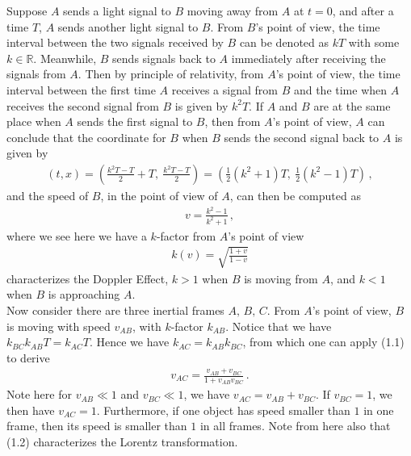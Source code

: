 \documentclass[11pt, onesided]{book}
\theoremstyle{break}
\theoremstyle{break}
\newcommand{\R}{\mathbb{R}}
\begin{document}
Suppose $A$ sends a light signal to $B$ moving away from $A$ at $t=0$, and after a time $T$, $A$ sends another light signal to $B$. From $B$'s point of view, the time interval between the two signals received by $B$ can be denoted as $kT$ with some $k \in \R$. Meanwhile, $B$ sends signals back to $A$ immediately after receiving the signals from $A$. Then by principle of relativity, from $A$'s point of view, the time interval between the first time $A$ receives a signal from $B$ and the time when $A$ receives the second signal from $B$ is given by $k^2 T$. If $A$ and $B$ are at the same place when $A$ sends the first signal to $B$, then from $A$'s point of view, $A$ can conclude that the coordinate for $B$ when $B$ sends the second signal back to $A$ is given by
\begin{align*}
(t,x) = \left( \frac{k^2T - T}{2} + T, \ \frac{k^2 T-T}{2}\right) = \left( \frac{1}{2}(k^2+1) T, \ \frac{1}{2}(k^2 - 1) T\right)\,,
\end{align*}
and the speed of $B$, in the point of view of $A$, can then be computed as
\begin{align*}
v = \frac{k^2 - 1}{k^2 +1}\,,
\end{align*}
where we see here we have a $k$-factor from $A$'s point of view
\begin{align}
k(v) = \sqrt{\frac{1+v}{1-v}}
\end{align}
characterizes the Doppler Effect, $k>1$ when $B$ is moving from $A$, and $k<1$ when $B$ is approaching $A$. \\


Now consider there are three inertial frames $A,\,B,\,C$. From $A$'s point of view, $B$ is moving with speed $v_{AB}$, with $k$-factor $k_{AB}$. Notice that we have $k_{BC} k_{AB}T = k_{AC}T$. Hence we have $k_{AC} = k_{AB} k_{BC}$, from which one can apply (1.1) to derive 
\begin{align}
v_{AC} = \frac{v_{AB}+v_{BC}}{1+v_{AB}v_{BC}}\,.
\end{align}
Note here for $v_{AB}\ll 1$ and $v_{BC}\ll 1$, we have $v_{AC} = v_{AB} + v_{BC}$. If $v_{BC} = 1$, we then have $v_{AC} =1$. Furthermore, if one object has speed smaller than $1$ in one frame, then its speed is smaller than $1$ in all frames. Note from here also that (1.2) characterizes the Lorentz transformation. \\
\end{document}
